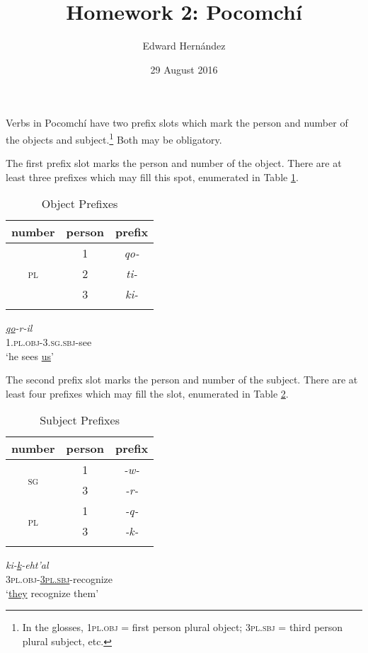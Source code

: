 \documentclass[doc,12pt]{apa6}
\begin{document}
\title{Homework 2: Pocomch\'{i}}
\author{Edward Hern\'{a}ndez}
\date{29 August 2016}
\maketitle

\setcounter{secnumdepth}{3}

Verbs in Pocomch\'{i} have two prefix slots which mark the person and number of
the objects and subject.\footnote{
	In the glosses, \textsc{1pl.obj} = first person plural object;
	\textsc{3pl.sbj} = third person plural subject, etc.
}
Both may be obligatory.

The first prefix slot marks the person and number of the object. There are at
least three prefixes which may fill this spot, enumerated in Table
\ref{table:obj}.
\begin{table}
	\begin{tabular}{ c c c }
		\textbf{number} & \textbf{person} & \textbf{prefix} \\ \hline
		\multirow{ 3}{*}{\textsc{pl}} & 1 & \textit{qo-} \\ \cline{2-3}
		& 2 & \textit{ti-} \\ \cline{2-3}
		& 3 & \textit{ki-} \\ \hline \\
	\end{tabular} 
	\caption{Object Prefixes}
	\label{table:obj}
\end{table}
\begin{exe}
	\ex
	\gll \textit{\underline{qo}-r-il} \\
	\textsc{1.pl.obj-3.sg.sbj-}see \\
	\trans `he sees \underline{us}'
\end{exe}

The second prefix slot marks the person and number of the subject. There are at
least four prefixes which may fill the slot, enumerated in Table
\ref{table:sbj}.
\begin{table}
	\begin{tabular}{ c c c }
		\textbf{number} & \textbf{person} & \textbf{prefix} \\ \hline
		\multirow{ 2}{*}{\textsc{sg}} & 1 & \textit{-w-} \\ \cline{2-3}
		& 3 & \textit{-r-} \\ \hline
		\multirow{ 2}{*}{\textsc{pl}} & 1 & \textit{-q-} \\ \cline{2-3}
		& 3 & \textit{-k-} \\ \hline \\
	\end{tabular} 
	\caption{Subject Prefixes}
	\label{table:sbj}
\end{table}
\begin{exe}
	\ex
	\gll \textit{ki-\underline{k}-eht'al} \\
	\textsc{3pl.obj-\underline{3pl.sbj}}-recognize \\
	\trans `\underline{they} recognize them'
\end{exe}
\end{document}
